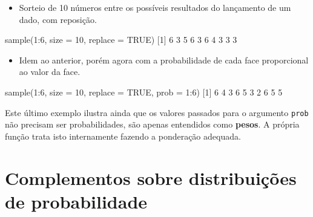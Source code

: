 \documentclass[
  10pt,
  a4paper]{book}
\newenvironment{Shaded}{\begin{snugshade}}{\end{snugshade}}
\newcommand{\AttributeTok}[1]{\textcolor[rgb]{0.77,0.63,0.00}{#1}}
\newcommand{\ConstantTok}[1]{\textcolor[rgb]{0.00,0.00,0.00}{#1}}
\newcommand{\DecValTok}[1]{\textcolor[rgb]{0.00,0.00,0.81}{#1}}
\newcommand{\FunctionTok}[1]{\textcolor[rgb]{0.00,0.00,0.00}{#1}}
\newcommand{\NormalTok}[1]{#1}
\newcommand{\SpecialCharTok}[1]{\textcolor[rgb]{0.00,0.00,0.00}{#1}}
\providecommand{\tightlist}{%
  \setlength{\itemsep}{0pt}\setlength{\parskip}{0pt}}
\begin{document}
\begin{itemize}
\tightlist
\item
  Sorteio de 10 números entre os possíveis resultados do lançamento de
  um dado, com reposição.
\end{itemize}

\begin{Shaded}
\begin{Highlighting}[]
\FunctionTok{sample}\NormalTok{(}\DecValTok{1}\SpecialCharTok{:}\DecValTok{6}\NormalTok{, }\AttributeTok{size =} \DecValTok{10}\NormalTok{, }\AttributeTok{replace =} \ConstantTok{TRUE}\NormalTok{)}
\NormalTok{ [}\DecValTok{1}\NormalTok{] }\DecValTok{6} \DecValTok{3} \DecValTok{5} \DecValTok{6} \DecValTok{3} \DecValTok{6} \DecValTok{4} \DecValTok{3} \DecValTok{3} \DecValTok{3}
\end{Highlighting}
\end{Shaded}

\begin{itemize}
\tightlist
\item
  Idem ao anterior, porém agora com a probabilidade de cada face proporcional
  ao valor da face.
\end{itemize}

\begin{Shaded}
\begin{Highlighting}[]
\FunctionTok{sample}\NormalTok{(}\DecValTok{1}\SpecialCharTok{:}\DecValTok{6}\NormalTok{, }\AttributeTok{size =} \DecValTok{10}\NormalTok{, }\AttributeTok{replace =} \ConstantTok{TRUE}\NormalTok{,  }\AttributeTok{prob =} \DecValTok{1}\SpecialCharTok{:}\DecValTok{6}\NormalTok{)}
\NormalTok{ [}\DecValTok{1}\NormalTok{] }\DecValTok{6} \DecValTok{4} \DecValTok{3} \DecValTok{6} \DecValTok{5} \DecValTok{3} \DecValTok{2} \DecValTok{6} \DecValTok{5} \DecValTok{5}
\end{Highlighting}
\end{Shaded}

Este último exemplo ilustra ainda que os valores passados para o
argumento \texttt{prob} não precisam ser probabilidades, são apenas entendidos
como \textbf{pesos}. A própria função trata isto internamente fazendo a
ponderação adequada.

\hypertarget{complementos-sobre-distribuiuxe7uxf5es-de-probabilidade}{%
\section{Complementos sobre distribuições de probabilidade}\label{complementos-sobre-distribuiuxe7uxf5es-de-probabilidade}}
\end{document}
